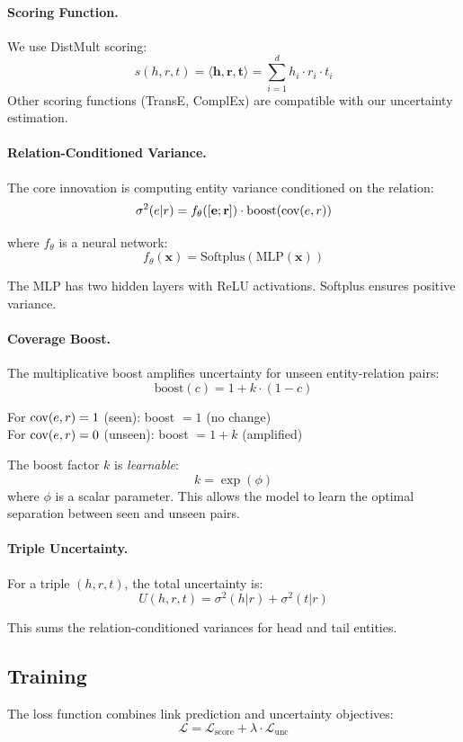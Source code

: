 \paragraph{Scoring Function.}
We use DistMult scoring:
\[
s(h, r, t) = \langle \mathbf{h}, \mathbf{r}, \mathbf{t} \rangle = \sum_{i=1}^d h_i \cdot r_i \cdot t_i
\]
Other scoring functions (TransE, ComplEx) are compatible with our uncertainty estimation.

\paragraph{Relation-Conditioned Variance.}
The core innovation is computing entity variance conditioned on the relation:
\[
\sigma^2(e | r) = f_\theta([\mathbf{e}; \mathbf{r}]) \cdot \text{boost}(\mathrm{cov}(e, r))
\]

where $f_\theta$ is a neural network:
\[
f_\theta(\mathbf{x}) = \text{Softplus}(\text{MLP}(\mathbf{x}))
\]

The MLP has two hidden layers with ReLU activations. Softplus ensures positive variance.

\paragraph{Coverage Boost.}
The multiplicative boost amplifies uncertainty for unseen entity-relation pairs:
\[
\text{boost}(c) = 1 + k \cdot (1 - c)
\]

For $\mathrm{cov}(e,r) = 1$ (seen): boost $= 1$ (no change)\\
For $\mathrm{cov}(e,r) = 0$ (unseen): boost $= 1 + k$ (amplified)

The boost factor $k$ is \emph{learnable}:
\[
k = \exp(\phi)
\]
where $\phi$ is a scalar parameter. This allows the model to learn the optimal separation between seen and unseen pairs.

\paragraph{Triple Uncertainty.}
For a triple $(h, r, t)$, the total uncertainty is:
\[
U(h, r, t) = \sigma^2(h | r) + \sigma^2(t | r)
\]

This sums the relation-conditioned variances for head and tail entities.

\subsection{Training}

The loss function combines link prediction and uncertainty objectives:
\[
\mathcal{L} = \mathcal{L}_\text{score} + \lambda \cdot \mathcal{L}_\text{unc}
\]

